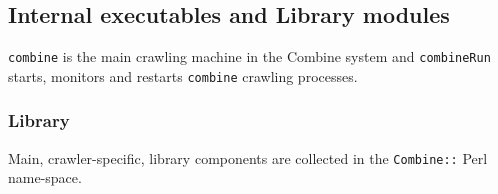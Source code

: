 \subsection{Internal executables and Library modules}
{\tt combine} is the main crawling machine in the Combine system and 
{\tt combineRun} starts, monitors and restarts {\tt combine} crawling processes.

\subsubsection{Library}

Main, crawler-specific, library components are collected in the {\tt Combine::} Perl name-space.